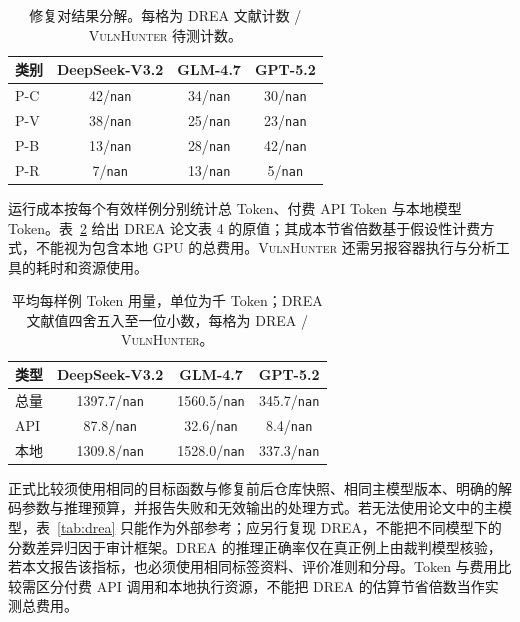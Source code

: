 \documentclass[times,twoside,watermark]{zHenriquesLab-StyleBioRxiv}
\newcommand{\VH}{\textsc{VulnHunter}}
\newcommand{\nan}{\texttt{nan}}
\begin{document}
\begin{table}[H]
\centering\footnotesize
\caption{修复对结果分解。每格为 DREA 文献计数 / \VH{} 待测计数。}
\label{tab:pair}
\begin{tabular}{lccc}
\toprule
类别 & DeepSeek-V3.2 & GLM-4.7 & GPT-5.2\\
\midrule
P-C & 42/\nan{} & 34/\nan{} & 30/\nan{}\\
P-V & 38/\nan{} & 25/\nan{} & 23/\nan{}\\
P-B & 13/\nan{} & 28/\nan{} & 42/\nan{}\\
P-R & 7/\nan{} & 13/\nan{} & 5/\nan{}\\
\bottomrule
\end{tabular}
\end{table}

运行成本按每个有效样例分别统计总 Token、付费 API Token 与本地模型 Token。表~\ref{tab:tokens} 给出 DREA 论文表 4 的原值；其成本节省倍数基于假设性计费方式，不能视为包含本地 GPU 的总费用。\VH{} 还需另报容器执行与分析工具的耗时和资源使用。

\begin{table}[H]
\centering\footnotesize
\caption{平均每样例 Token 用量，单位为千 Token；DREA 文献值四舍五入至一位小数，每格为 DREA / \VH{}。}
\label{tab:tokens}
\begin{tabular}{lccc}
\toprule
类型 & DeepSeek-V3.2 & GLM-4.7 & GPT-5.2\\
\midrule
总量 & 1397.7/\nan{} & 1560.5/\nan{} & 345.7/\nan{}\\
API & 87.8/\nan{} & 32.6/\nan{} & 8.4/\nan{}\\
本地 & 1309.8/\nan{} & 1528.0/\nan{} & 337.3/\nan{}\\
\bottomrule
\end{tabular}
\end{table}
正式比较须使用相同的目标函数与修复前后仓库快照、相同主模型版本、明确的解码参数与推理预算，并报告失败和无效输出的处理方式。若无法使用论文中的主模型，表~\ref{tab:drea} 只能作为外部参考；应另行复现 DREA，不能把不同模型下的分数差异归因于审计框架。DREA 的推理正确率仅在真正例上由裁判模型核验，若本文报告该指标，也必须使用相同标签资料、评价准则和分母。Token 与费用比较需区分付费 API 调用和本地执行资源，不能把 DREA 的估算节省倍数当作实测总费用。
\end{document}
